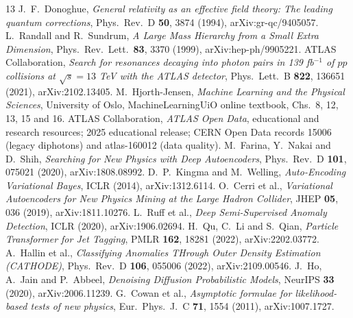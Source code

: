 \documentclass[11pt,a4paper]{article}
\newcommand{\arxiv}[1]{arXiv:#1}
\begin{document}
\begingroup
\fontsize{8.8}{10.2}\selectfont
\setlength{\parskip}{0pt}
\renewcommand{\refname}{6.\ Literature and data resources}
\begin{thebibliography}{13}
\setlength{\itemsep}{2.5pt}
J.~F.~Donoghue, \emph{General relativity as an effective field theory: The leading quantum corrections},
Phys.\ Rev.\ D \textbf{50}, 3874 (1994), \arxiv{gr-qc/9405057}.
L.~Randall and R.~Sundrum, \emph{A Large Mass Hierarchy from a Small Extra Dimension},
Phys.\ Rev.\ Lett.\ \textbf{83}, 3370 (1999), \arxiv{hep-ph/9905221}.
ATLAS Collaboration, \emph{Search for resonances decaying into photon pairs in 139 fb$^{-1}$ of $pp$ collisions at $\sqrt{s}=13$ TeV with the ATLAS detector},
Phys.\ Lett.\ B \textbf{822}, 136651 (2021), \arxiv{2102.13405}.
M.~Hjorth-Jensen, \emph{Machine Learning and the Physical Sciences}, University of Oslo,
MachineLearningUiO online textbook, Chs.~8, 12, 13, 15 and 16.
ATLAS Collaboration, \emph{ATLAS Open Data}, educational and research resources; 2025 educational release; CERN Open Data records 15006 (legacy diphotons) and atlas-160012 (data quality).
M.~Farina, Y.~Nakai and D.~Shih, \emph{Searching for New Physics with Deep Autoencoders},
Phys.\ Rev.\ D \textbf{101}, 075021 (2020), \arxiv{1808.08992}.
D.~P.~Kingma and M.~Welling, \emph{Auto-Encoding Variational Bayes},
ICLR (2014), \arxiv{1312.6114}.
O.~Cerri et al., \emph{Variational Autoencoders for New Physics Mining at the Large Hadron Collider},
JHEP \textbf{05}, 036 (2019), \arxiv{1811.10276}.
L.~Ruff et al., \emph{Deep Semi-Supervised Anomaly Detection}, ICLR (2020),
\arxiv{1906.02694}.
H.~Qu, C.~Li and S.~Qian, \emph{Particle Transformer for Jet Tagging},
PMLR \textbf{162}, 18281 (2022), \arxiv{2202.03772}.
A.~Hallin et al., \emph{Classifying Anomalies THrough Outer Density Estimation (CATHODE)},
Phys.\ Rev.\ D \textbf{106}, 055006 (2022), \arxiv{2109.00546}.
J.~Ho, A.~Jain and P.~Abbeel, \emph{Denoising Diffusion Probabilistic Models},
NeurIPS \textbf{33} (2020), \arxiv{2006.11239}.
G.~Cowan et al., \emph{Asymptotic formulae for likelihood-based tests of new physics},
Eur.\ Phys.\ J.\ C \textbf{71}, 1554 (2011), \arxiv{1007.1727}.
\end{thebibliography}
\endgroup
\end{document}
